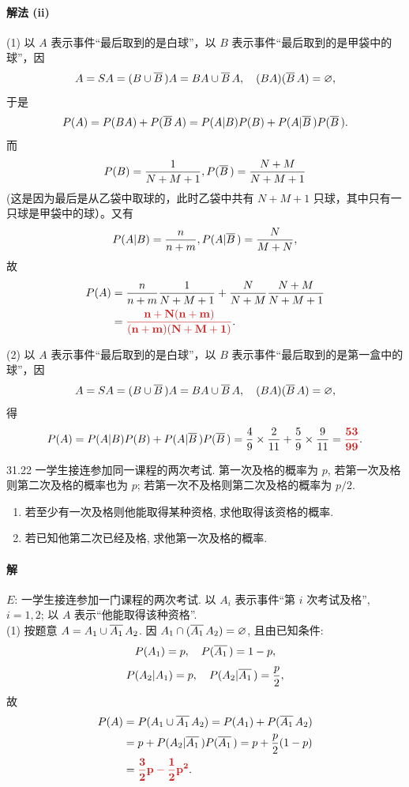\documentclass[11pt, UTF8]{ctexart}
\newcommand{\Prob}{P}
\newcommand{\comp}[1]{\overline{#1}\mskip 3mu}
\newcommand{\ans}[1]{\mathbf{\color{fred}#1}}
\begin{document}
\paragraph{\color{fblue}解法 (ii)}
(1) 以 $A$ 表示事件“最后取到的是白球”，以 $B$ 表示事件“最后取到的是甲袋中的球”，因
\[ A = SA = (B \cup \comp{B})A = BA \cup \comp{B}A, \quad (BA)(\comp{B}A) = \varnothing, \]
于是
\[ \Prob(A) = \Prob(BA) + \Prob(\comp{B}A) = \Prob(A|B)\Prob(B) + \Prob(A|\comp{B})\Prob(\comp{B}). \]
而 
$$\Prob(B) = \frac{1}{N+M+1}, \Prob(\comp{B}) = \frac{N+M}{N+M+1}$$
(这是因为最后是从乙袋中取球的，此时乙袋中共有 $N+M+1$ 只球，其中只有一只球是甲袋中的球）。又有 
$$\Prob(A|B) = \frac{n}{n+m}, \Prob(A|\comp{B}) = \frac{N}{M+N},$$
故
\begin{align*}
    \Prob(A) &= \frac{n}{n+m} \frac{1}{N+M+1} + \frac{N}{N+M} \frac{N+M}{N+M+1} \\
             &= \ans{\frac{n+N(n+m)}{(n+m)(N+M+1)}}.
\end{align*}

(2) 以 $A$ 表示事件“最后取到的是白球”，以 $B$ 表示事件“最后取到的是第一盒中的球”，因
\[ A = SA = (B \cup \comp{B})A = BA \cup \comp{B}A, \quad (BA)(\comp{B}A) = \varnothing, \]
得
\[ \Prob(A) = \Prob(A|B)\Prob(B) + \Prob(A|\comp{B})\Prob(\comp{B}) = \frac{4}{9} \times \frac{2}{11} + \frac{5}{9} \times \frac{9}{11} = \ans{\frac{53}{99}}. \]

\vspace{1.5em}

\begin{problem}{3}{1.22}
一学生接连参加同一课程的两次考试. 第一次及格的概率为 $p$, 若第一次及格则第二次及格的概率也为 $p$; 若第一次不及格则第二次及格的概率为 $p/2$.
\begin{enumerate}
    \item[(1)] 若至少有一次及格则他能取得某种资格, 求他取得该资格的概率. 
    \item[(2)] 若已知他第二次已经及格, 求他第一次及格的概率.
\end{enumerate}
\end{problem}

\paragraph{\color{fblue}解}
$E$: 一学生接连参加一门课程的两次考试. 以 $A_i$ 表示事件“第 $i$ 次考试及格”, $i=1,2$; 以 $A$ 表示“他能取得该种资格”. \\
(1) 按题意 $A = A_1 \cup \comp{A_1} A_2$. 因 $A_1 \cap (\comp{A_1} A_2) = \varnothing$, 且由已知条件:
\[ \Prob(A_1) = p, \quad \Prob(\comp{A_1}) = 1-p, \]
\[ \Prob(A_2 | A_1) = p, \quad \Prob(A_2 | \comp{A_1}) = \frac{p}{2}, \]
故
\begin{align*}
    \Prob(A) &= \Prob(A_1 \cup \comp{A_1} A_2) = \Prob(A_1) + \Prob(\comp{A_1} A_2) \\
             &= p + \Prob(A_2 | \comp{A_1})\Prob(\comp{A_1}) = p + \frac{p}{2}(1-p) \\
             &= \ans{{\frac{3}{2}p - \frac{1}{2}p^2}}.
\end{align*}
\end{document}
